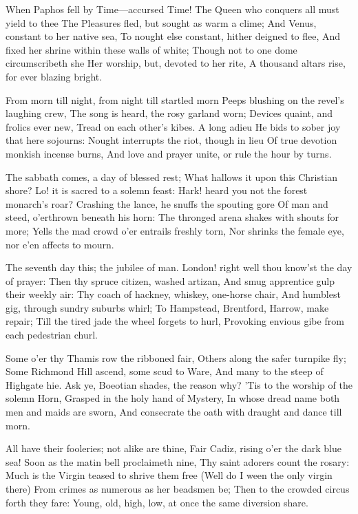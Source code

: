 \documentclass[10pt,twocolumn]{book}
\begin{document}
   When Paphos fell by Time---accursed Time!
   The Queen who conquers all must yield to thee\textemdash
   The Pleasures fled, but sought as warm a clime;
   And Venus, constant to her native sea,
   To nought else constant, hither deigned to flee,
   And fixed her shrine within these walls of white;
   Though not to one dome circumscribeth she
   Her worship, but, devoted to her rite,
A thousand altars rise, for ever blazing bright.


   From morn till night, from night till startled morn
   Peeps blushing on the revel's laughing crew,
   The song is heard, the rosy garland worn;
   Devices quaint, and frolics ever new,
   Tread on each other's kibes.  A long adieu
   He bids to sober joy that here sojourns:
   Nought interrupts the riot, though in lieu
   Of true devotion monkish incense burns,
And love and prayer unite, or rule the hour by turns.


   The sabbath comes, a day of blessed rest;
   What hallows it upon this Christian shore?
   Lo! it is sacred to a solemn feast:
   Hark! heard you not the forest monarch's roar?
   Crashing the lance, he snuffs the spouting gore
   Of man and steed, o'erthrown beneath his horn:
   The thronged arena shakes with shouts for more;
   Yells the mad crowd o'er entrails freshly torn,
Nor shrinks the female eye, nor e'en affects to mourn.


   The seventh day this; the jubilee of man.
   London! right well thou know'st the day of prayer:
   Then thy spruce citizen, washed artizan,
   And smug apprentice gulp their weekly air:
   Thy coach of hackney, whiskey, one-horse chair,
   And humblest gig, through sundry suburbs whirl;
   To Hampstead, Brentford, Harrow, make repair;
   Till the tired jade the wheel forgets to hurl,
Provoking envious gibe from each pedestrian churl.

   Some o'er thy Thamis row the ribboned fair,
   Others along the safer turnpike fly;
   Some Richmond Hill ascend, some scud to Ware,
   And many to the steep of Highgate hie.
   Ask ye, Boeotian shades, the reason why?
   'Tis to the worship of the solemn Horn,
   Grasped in the holy hand of Mystery,
   In whose dread name both men and maids are sworn,
And consecrate the oath with draught and dance till morn.


   All have their fooleries; not alike are thine,
   Fair Cadiz, rising o'er the dark blue sea!
   Soon as the matin bell proclaimeth nine,
   Thy saint adorers count the rosary:
   Much is the Virgin teased to shrive them free
   (Well do I ween the only virgin there)
   From crimes as numerous as her beadsmen be;
   Then to the crowded circus forth they fare:
Young, old, high, low, at once the same diversion share.
\end{document}

